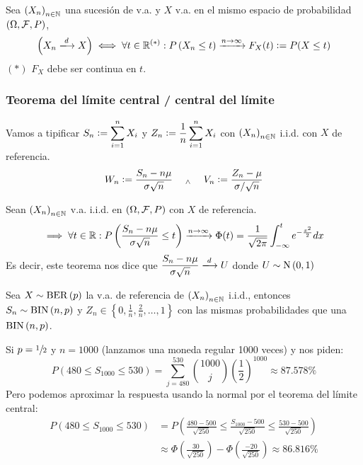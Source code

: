 \begin{defn}
	Sea $\left(X_n\right)_{n\in \mathbb{N}}$ una sucesión de v.a. y $X$ v.a. en el mismo espacio de probabilidad $(\Omega, \mathcal{F}, P)$,
	\[\left(X_n \xlongrightarrow{d} X\right) \iff \forall t \in \R^{(*)} : P\left(X_n \leq t\right) \xrightarrow{n\to\infty} F_X(t) \defeq P(X \leq t)\]
	\hspace*{\fill} $(*)$ $F_X$ debe ser continua en $t$.
\end{defn}

\subsubsection{Teorema del límite central / central del límite}

Vamos a tipificar $\displaystyle S_n\vcentcolon= \sum_{i=1}^{n} X_i$ y $\displaystyle Z_n \vcentcolon= \frac{1}{n}\sum_{i=1}^{n} X_i$ con $\left(X_n\right)_{n\in \mathbb{N}}$ i.i.d. con $X$ de referencia.
\[W_n \vcentcolon= \frac{S_n - n\mu}{\sigma \sqrt{n}} \quad \; _{\wedge} \; \quad V_n \vcentcolon= \frac{Z_n - \mu}{\sigma/\sqrt{n}}\]

\begin{teo}
	Sean $\left(X_n\right)_{n\in \mathbb{N}}$ v.a. i.i.d. en $(\Omega, \mathcal{F}, P)$ con $X$ de referencia.
	\[\implies \forall t \in \mathbb{R} : P\left(\frac{S_n - n\mu}{\sigma \sqrt{n}} \leq t\right) \xrightarrow{n\to\infty} \Phi(t) = \frac{1}{\sqrt{2\pi}}\int_{-\infty}^{t} e^{-\frac{x^2}{2}}dx\]
	Es decir, este teorema nos dice que $\ds \frac{S_n - n\mu}{\sigma \sqrt{n}} \xlongrightarrow{d} U$ donde $U\sim\operatorname{N}\left(0,1\right)$
\end{teo}

\begin{ejem}
	Sea $X\sim \operatorname{BER}\left(p\right)$ la v.a. de referencia de $\left(X_n\right)_{n\in \mathbb{N}}$ i.i.d., entonces \\
	$S_n \sim \operatorname{BIN}\left(n,p\right)$ y $Z_n \in \left\{0, \frac{1}{n}, \frac{2}{n}, \dots, 1\right\}$ con las mismas probabilidades que una $\operatorname{BIN}\left(n,p\right)$.

	Si $p=\sfrac{1}{2}$ y $n=1000$ (lanzamos una moneda regular 1000 veces) y nos piden:
	\[P(480 \leq S_{1000} \leq 530) = \sum_{j=480}^{530} \binom{1000}{j} \left(\frac{1}{2}\right)^{1000} \approx 87.578\%\]
	Pero podemos aproximar la respuesta usando la normal por el teorema del límite central:
	\[\begin{aligned}
			P(480 \leq S_{1000} \leq 530) & = P\left(\frac{480-500}{\sqrt{250}} \leq \frac{S_{1000}-500}{\sqrt{250}} \leq \frac{530-500}{\sqrt{250}}\right) \\
			                              & \approx \Phi\left(\frac{30}{\sqrt{250}}\right) - \Phi\left(\frac{-20}{\sqrt{250}}\right) \approx 86.816\%
		\end{aligned}\]
\end{ejem}

